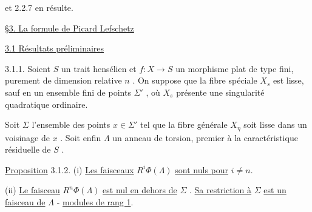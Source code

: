 \begin{center}
\end{center}
et 2.2.7 en résulte.


\underline{\S3.  La formule de Picard Lefschetz}


\underline{3.1  Résultats préliminaires}

3.1.1.  Soient  $S$  un trait hensélien et  $f : X \to S$  un morphisme plat de type fini, purement de dimension relative  $n$  . On suppose que la fibre spéciale  $X_s$  est lisse, sauf en un ensemble fini de points  $\Sigma'$  , où  $X_s$  présente une singularité quadratique ordinaire.



Soit $\Sigma$ l'ensemble des points $x \in \Sigma'$ tel que la fibre générale $X_{\eta}$ soit lisse dans un voisinage de $x$ . Soit enfin $\Lambda$ un anneau de torsion, premier à la caractéristique résiduelle de $S$ .

\underline{Proposition} 3.1.2.  (i) \underline{Les faisceaux} $R^{i}\Phi(\Lambda)$ \underline{sont nuls pour} $i \neq n$.

(ii)  \underline{Le faisceau} $R^{n}\Phi(\Lambda)$ \underline{est nul en dehors de} $\Sigma$ . \underline{Sa restriction à} $\Sigma$ \underline{est un faisceau de} $\Lambda$ - \underline{modules de rang 1}.

